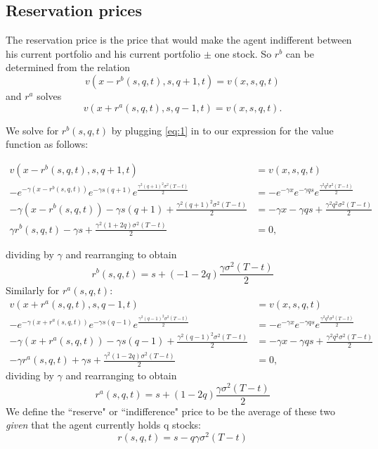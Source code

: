\subsection{Reservation prices}

The reservation price is the price that would make the agent indifferent between his current portfolio and his current portfolio $\pm$ one stock. So $r^b$ can be determined from the relation
\begin{equation} \label{eq:1}
    v(x-r^b(s,q,t),s,q+1,t)=v(x,s,q,t)
\end{equation}
and $r^a$ solves
\begin{equation}
    v(x+r^a(s,q,t),s,q-1,t)=v(x,s,q,t).
\end{equation}

We solve for $r^b(s,q,t)$ by plugging \ref{eq:1} in to our expression for the value function as follows:

\begin{align*}
    v(x-r^b(s,q,t),s,q+1,t)&=v(x,s,q,t)\\
    -e^{-\gamma(x-r^b(s,q,t))}e^{-\gamma s(q+1)}e^{\frac{\gamma^2(q+1)^2\sigma^2(T-t)}{2}}&=-e^{-\gamma x}e^{-\gamma q s}e^{\frac{\gamma^2q^2\sigma^2(T-t)}{2}}\\
    -\gamma(x-r^b(s,q,t))-\gamma s(q+1) + \frac{\gamma^2(q+1)^2\sigma^2(T-t)}{2} &= -\gamma x-\gamma q s + \frac{\gamma^2q^2\sigma^2(T-t)}{2}\\
    \gamma r^b(s,q,t)-\gamma s + \frac{\gamma^2(1+2q)\sigma^2(T-t)}{2} &=0,
\end{align*}

dividing by $\gamma$ and rearranging to obtain
\begin{equation}
    r^b(s,q,t)=s+(-1-2q)\frac{\gamma\sigma^2(T-t)}{2}
\end{equation}
Similarly for $r^a(s,q,t)$:
\begin{align*}
    v(x+r^a(s,q,t),s,q-1,t)&=v(x,s,q,t)\\
    -e^{-\gamma(x+r^a(s,q,t))}e^{-\gamma s(q-1)}e^{\frac{\gamma^2(q-1)^2\sigma^2(T-t)}{2}}&=-e^{-\gamma x}e^{-\gamma q s}e^{\frac{\gamma^2q^2\sigma^2(T-t)}{2}}\\
    -\gamma(x+r^a(s,q,t))-\gamma s(q-1)+\frac{\gamma^2(q-1)^2\sigma^2(T-t)}{2}&=-\gamma x-\gamma q s + \frac{\gamma^2q^2\sigma^2(T-t)}{2}\\
    -\gamma r^a(s,q,t) + \gamma s + \frac{\gamma^2(1-2q)\sigma^2(T-t)}{2}&=0,
\end{align*}
dividing by $\gamma$ and rearranging to obtain
\begin{equation}
    r^a(s,q,t)=s+(1-2q)\frac{\gamma\sigma^2(T-t)}{2}
\end{equation}
We define the ``reserve" or ``indifference" price to be the average of these two \textit{given} that the agent currently holds q stocks:
$$r(s,q,t)=s-q\gamma\sigma^2(T-t)$$

